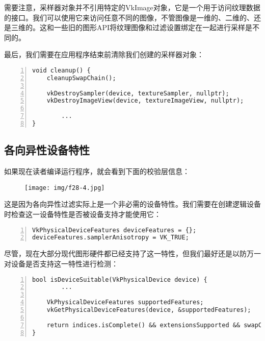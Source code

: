 \documentclass{ctexart}
\begin{document}
需要注意，采样器对象并不引用特定的VkImage对象，它是一个用于访问纹理数据的接口。我们可以使用它来访问任意不同的图像，不管图像是一维的、二维的、还是三维的。这和一些旧的图形API将纹理图像和过滤设置绑定在一起进行采样是不同的。

最后，我们需要在应用程序结束前清除我们创建的采样器对象：

\begin{lstlisting}[language={[ANSI]C},keywordstyle=\color{blue!70},commentstyle=\color{red!50!green!50!blue!50},frame=shadowbox, rulesepcolor=\color{red!20!green!20!blue!20},basicstyle=\small,numbers=left, numberstyle=\tiny,breaklines=true]
void cleanup() {
	cleanupSwapChain();

	vkDestroySampler(device, textureSampler, nullptr);
	vkDestroyImageView(device, textureImageView, nullptr);

		...
}
\end{lstlisting}

\subsection{各向异性设备特性}

如果现在读者编译运行程序，就会看到下面的校验层信息：

\begin{figure}[H]
	\centering
	\texttt{[image: img/f28-4.jpg]}
\end{figure}

这是因为各向异性过滤实际上是一个非必需的设备特性。我们需要在创建逻辑设备时检查这一设备特性是否被设备支持才能使用它：

\begin{lstlisting}[language={[ANSI]C},keywordstyle=\color{blue!70},commentstyle=\color{red!50!green!50!blue!50},frame=shadowbox, rulesepcolor=\color{red!20!green!20!blue!20},basicstyle=\small,numbers=left, numberstyle=\tiny,breaklines=true]
VkPhysicalDeviceFeatures deviceFeatures = {};
deviceFeatures.samplerAnisotropy = VK_TRUE;
\end{lstlisting}

尽管，现在大部分现代图形硬件都已经支持了这一特性，但我们最好还是以防万一对设备是否支持这一特性进行检测：

\begin{lstlisting}[language={[ANSI]C},keywordstyle=\color{blue!70},commentstyle=\color{red!50!green!50!blue!50},frame=shadowbox, rulesepcolor=\color{red!20!green!20!blue!20},basicstyle=\small,numbers=left, numberstyle=\tiny,breaklines=true]
bool isDeviceSuitable(VkPhysicalDevice device) {
		...

	VkPhysicalDeviceFeatures supportedFeatures;
	vkGetPhysicalDeviceFeatures(device, &supportedFeatures);

	return indices.isComplete() && extensionsSupported && swapChainAdequate && supportedFeatures.samplerAnisotropy;
}
\end{lstlisting}
\end{document}
